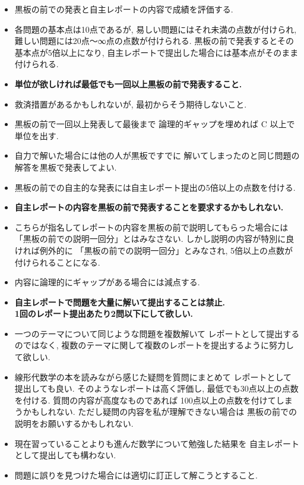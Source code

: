 \documentclass[12pt,twoside]{jarticle}
\begin{document}
\begin{itemize}
 \item 黒板の前での発表と自主レポートの内容で成績を評価する.
 \item 各問題の基本点は10点であるが, 
       易しい問題にはそれ未満の点数が付けられ, 
       難しい問題には20点〜∞点の点数が付けられる.
       黒板の前で発表するとその基本点が5倍以上になり, 
       自主レポートで提出した場合には基本点がそのまま付けられる.
 \item {\bf 単位が欲しければ最低でも一回以上黒板の前で発表すること.}
 \item 救済措置があるかもしれないが, 最初からそう期待しないこと.
 \item 黒板の前で一回以上発表して最後まで
       論理的ギャップを埋めれば C 以上で単位を出す.
 \item 自力で解いた場合には他の人が黒板ですでに
       解いてしまったのと同じ問題の解答を黒板で発表してよい.
 \item 黒板の前での自主的な発表には自主レポート提出の5倍以上の点数を付ける.
 \item {\bf 自主レポートの内容を黒板の前で発表することを要求するかもしれない.}
 \item こちらが指名してレポートの内容を黒板の前で説明してもらった場合には
       「黒板の前での説明一回分」とはみなさない.
       しかし説明の内容が特別に良ければ例外的に
       「黒板の前での説明一回分」とみなされ, 
       5倍以上の点数が付けられることになる.
 \item 内容に論理的にギャップがある場合には減点する.
 \item {\bf 自主レポートで問題を大量に解いて提出することは禁止.\\
       1回のレポート提出あたり2問以下にして欲しい.}
 \item 一つのテーマについて同じような問題を複数解いて
       レポートとして提出するのではなく, 
       複数のテーマに関して複数のレポートを提出するように努力して欲しい.
 \item 線形代数学の本を読みながら感じた疑問を質問にまとめて
       レポートとして提出しても良い.
       そのようなレポートは高く評価し, 
       最低でも30点以上の点数を付ける.
       質問の内容が高度なものであれば
       100点以上の点数を付けてしまうかもしれない.
       ただし疑問の内容を私が理解できない場合は
       黒板の前での説明をお願いするかもしれない.
 \item 現在習っていることよりも進んだ数学について勉強した結果を
       自主レポートとして提出しても構わない.
 \item 問題に誤りを見つけた場合には適切に訂正して解こうとすること.
\end{itemize}
\end{document}
